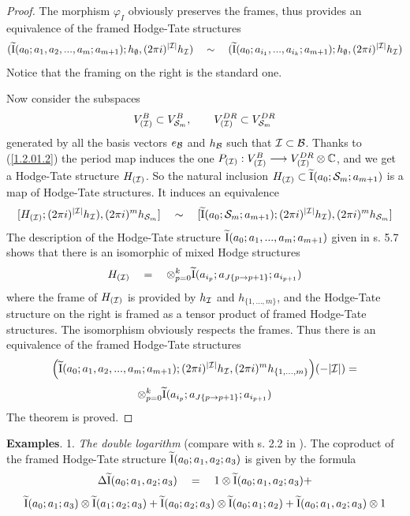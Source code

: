 \documentclass[10pt]{article}
\begin{document}
\begin{proof}
The morphism $\varphi_I$ obviously preserves the frames, thus 
provides an equivalence 
of the framed Hodge-Tate 
structures 
$$
({\widetilde {\rm I}}(a_0; a_1, a_2, ..., a_m; a_{m+1}); h_{\emptyset}, (2\pi i)^{|{\cal I}|}h_{\cal I})  
\quad \sim \quad ({\widetilde {\rm I}}(a_0; a_{i_1},  ..., a_{i_k}; a_{m+1}); h_{\emptyset}, (2\pi i)^{|{\cal I}|}h_{\cal I}) 
$$ 
Notice  that the framing  on the right is the standard one.  

Now consider the subspaces $$
V_{({\cal I})}^B \subset V_{{\cal S}_m}^B, \qquad 
V_{({\cal I})}^{DR} \subset V_{{\cal S}_m}^{DR}
$$ 
generated by all the basis vectors $e_{\cal B}$ and $h_{\cal B}$ such that ${\cal I} \subset {\cal B}$. 
Thanks to (\ref{1.2.01.2}) 
the period map induces the one $P_{({\cal I})}: V_{({\cal I})}^B \longrightarrow 
V_{({\cal I})}^{DR}\otimes {\mathbb C}$, and we get a Hodge-Tate structure 
$H_{({\cal I})}$. 
So the natural inclusion $H_{({\cal I})} \subset 
{\widetilde {\rm I}}(a_0; {\cal S}_m; a_{m+1})$ is a map of Hodge-Tate structures. 
It induces an equivalence
$$
[H_{({\cal I})}; (2\pi i)^{|{\cal I}|}h_{\cal I}), (2\pi i)^{m}h_{{\cal S}_m}] 
\quad\sim \quad [{\widetilde {\rm I}}(a_0; {\cal S}_m; a_{m+1}); 
(2\pi i)^{|{\cal I}|}h_{\cal I}), (2\pi i)^{m}h_{{\cal S}_m}]
$$
The description of the Hodge-Tate 
structure  $\widetilde {\rm I}(a_0; a_1, ..., a_m; a_{m+1})$ given in s. 5.7 shows 
that there is an isomorphic of mixed Hodge structures
\begin{equation} \label{1.2.01.3}
H_{({\cal I})}\quad = \quad \otimes_{p=0}^k
\widetilde {\rm I}(a_{i_p}; a_{J{\{p \rightarrow p+1}\}}; a_{i_{p+1}})
\end{equation}
where the frame of $H_{({\cal I})}$ 
is provided  by  $h_{\cal I}$ and $h_{\{1, ..., m\}}$, 
and the Hodge-Tate structure on the right is framed as a tensor product of 
framed Hodge-Tate structures. 
The isomorphism obviously respects the frames. Thus there is an equivalence 
of the framed Hodge-Tate structures
$$
\Bigl({\widetilde {\rm I}}(a_0; a_1, a_2, ..., a_m; a_{m+1});  (2\pi i)^{|{\cal I}|}h_{\cal I}, 
(2\pi i)^{m}h_{\{1, ..., m\}}\Bigr)(-|{\cal I}|) = 
$$
$$ 
\otimes_{p=0}^k
\widetilde {\rm I}(a_{i_p}; a_{J{\{p \rightarrow p+1}\}}; a_{i_{p+1}})
$$ 
 The theorem is proved. 
 

\end{proof}

{\bf Examples}. 1. {\it The double logarithm} (compare with s. 2.2 in \cite{G2}). 
The coproduct of the framed Hodge-Tate structure 
${\widetilde {\rm I}}(a_0; a_1, a_2; a_3)$ 
is given by the formula
$$
\Delta {\widetilde {\rm I}}(a_0; a_1, a_2; a_3) \quad = \quad 1 \otimes {\widetilde {\rm I}}(a_0; a_1, a_2; a_3) +
$$
$$
{\widetilde {\rm I}}(a_0; a_1; a_3) \otimes {\widetilde {\rm I}}(a_1; a_2; a_3) +  
{\widetilde {\rm I}}(a_0; a_2; a_3) \otimes {\widetilde {\rm I}}(a_0; a_1; a_2) +
{\widetilde {\rm I}}(a_0; a_1, a_2; a_3) \otimes 1 
$$
\end{document}

